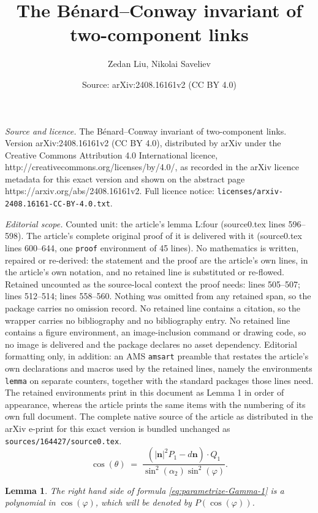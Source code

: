 \documentclass[10pt,a4paper]{amsart}
\title{The Bénard--Conway invariant of two-component links}
\author{Zedan Liu, Nikolai Saveliev}
\date{Source: arXiv:2408.16161v2 (CC BY 4.0)}
\newtheorem{lemma}{Lemma}
\newcommand{\n}{\mathbf n}
\renewcommand{\phi}{\varphi}
\begin{document}
\maketitle

\noindent\emph{Source and licence.} The Bénard--Conway invariant of two-component links. Version arXiv:2408.16161v2 (CC BY 4.0), distributed by arXiv under the Creative Commons Attribution 4.0 International licence, http://creativecommons.org/licenses/by/4.0/, as recorded in the arXiv licence metadata for this exact version and shown on the abstract page https://arxiv.org/abs/2408.16161v2. Full licence notice: \texttt{licenses/arxiv-2408.16161-CC-BY-4.0.txt}.\par\smallskip

\noindent\textit{Editorial scope.} Counted unit: the article's lemma L:four (source0.tex lines 596--598). The article's complete original proof of it is delivered with it (source0.tex lines 600--644, one \texttt{proof} environment of 45 lines). No mathematics is written, repaired or re-derived: the statement and the proof are the article's own lines, in the article's own notation, and no retained line is substituted or re-flowed.  Retained uncounted as the source-local context the proof needs: lines 505--507; lines 512--514; lines 558--560.  Nothing was omitted from any retained span, so the package carries no omission record.  No retained line contains a citation, so the wrapper carries no bibliography and no bibliography entry.  No retained line contains a figure environment, an image-inclusion command or drawing code, so no image is delivered and the package declares no asset dependency.  Editorial formatting only, in addition: an AMS \texttt{amsart} preamble that restates the article's own declarations and macros used by the retained lines, namely the environments \texttt{lemma} on separate counters, together with the standard packages those lines need.  The retained environments print in this document as Lemma 1 in order of appearance, whereas the article prints the same items with the numbering of its own full document.  The complete native source of the article as distributed in the arXiv e-print for this exact version is bundled unchanged as \texttt{sources/164427/source0.tex}.
\begin{equation}\label{eq:parametrize-Gamma-1}
\cos(\theta)\; =\; \frac{(|\n|^2 P_1 - d\n) \cdot Q_1}{\sin^2(\alpha_2) \sin^2(\phi)}.
\end{equation}

\begin{lemma}\label{L:one}
The right hand side of formula \eqref{eq:parametrize-Gamma-1} is a polynomial in $\cos (\phi)$, which will be denoted by $P(\cos(\phi))$.
\end{lemma}
\end{document}
